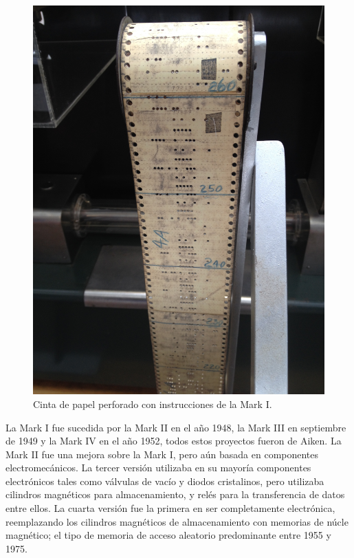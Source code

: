 \begin{figure}
  \centering
  \includegraphics[scale=0.05]{./figures/C02-mark_i_instruction_tape}
  \captionsetup{justification=centering}
  \caption{Cinta de papel perforado con instrucciones de la Mark I.}
  \label{fig:C02-mark_i_instruction_tape}
\end{figure}
La Mark I fue sucedida por la Mark II en el año 1948, la Mark III en septiembre
de 1949 y la Mark IV en el año 1952, todos estos proyectos fueron de Aiken. La
Mark II fue una mejora sobre la Mark I, pero aún basada en componentes
electromecánicos. La tercer versión utilizaba en su mayoría componentes
electrónicos tales como válvulas de vacío y diodos cristalinos, pero utilizaba
cilindros magnéticos para almacenamiento, y relés para la transferencia de datos
entre ellos. La cuarta versión fue la primera en ser completamente electrónica,
reemplazando los cilindros magnéticos de almacenamiento con memorias de núcle
magnético; el tipo de memoria de acceso aleatorio predominante entre 1955 y
1975.

